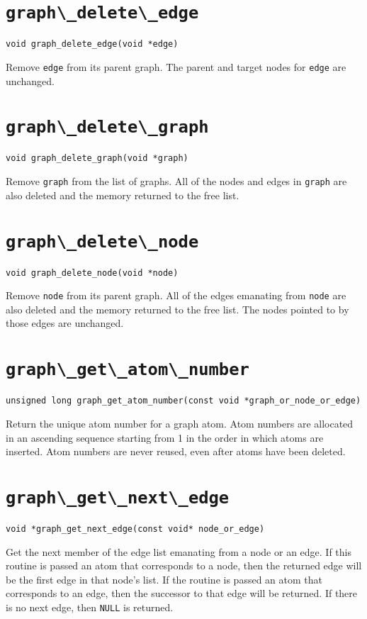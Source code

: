 \section{\protect\verb+graph\_delete\_edge+}
\begin{verbatim}
void graph_delete_edge(void *edge)
\end{verbatim}
Remove {\tt edge} from its parent graph. The parent and target nodes for {\tt edge} are unchanged.

\section{\protect\verb+graph\_delete\_graph+}
\begin{verbatim}
void graph_delete_graph(void *graph)
\end{verbatim}
Remove {\tt graph} from the list of graphs. All of the nodes and edges in {\tt graph} are also
deleted and the memory returned to the free list.

\section{\protect\verb+graph\_delete\_node+}
\begin{verbatim}
void graph_delete_node(void *node)
\end{verbatim}
Remove {\tt node} from its parent graph. All of the edges emanating from {\tt node} are also
deleted and the memory returned to the free list. The nodes pointed to by those edges are
unchanged.

\section{\protect\verb+graph\_get\_atom\_number+}
\begin{verbatim}
unsigned long graph_get_atom_number(const void *graph_or_node_or_edge)
\end{verbatim}
Return the unique atom number for a graph atom. Atom numbers are allocated in an ascending sequence
starting from 1 in the order in which atoms are inserted. Atom numbers are never reused, even after
atoms have been deleted.

\section{\protect\verb+graph\_get\_next\_edge+}
\begin{verbatim}
void *graph_get_next_edge(const void* node_or_edge)
\end{verbatim}
Get the next member of the edge list emanating from a node or an edge.
If this routine is passed an atom that corresponds to a node, then the
returned edge will be the first edge in that node's list. If the routine
is passed an atom that corresponds to an edge, then the successor to
that edge will be returned. If there is no next edge, then {\tt NULL} is
returned.

